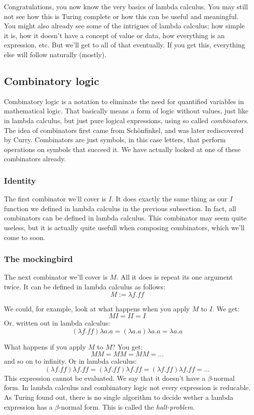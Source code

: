 \documentclass[a4paper]{article}
\begin{document}
Congratulations, you now know the very basics of lambda calculus. You may still
not see how this is Turing complete or how this can be useful and meaningful.
You might also already see some of the intrigues of lambda calculus; how simple
it is, how it doesn't have a concept of value or data, how everything is an
expression, etc. But we'll get to all of that eventually. If you get this,
everything else will follow naturally (mostly).

\subsection{Combinatory logic}


Combinatory logic is a notation to eliminate the need for quantified variables
in mathematical logic. That basically means a form of logic without values,
just like in lambda calculus, but just pure logical expressions, using so
called \emph{combinators}. The idea of combinators first came from Schönfinkel,
and was later rediscovered by Curry. Combinators are just symbols, in this case
letters, that perform operations on symbols that succeed it. We have actually
looked at one of these combinators already.

\subsubsection{Identity}

The first combinator we'll cover is \(I\). It does exactly the same thing as
our \(I\) function we defined in lambda calculus in the previous subsection.
In fact, all combinators can be defined in lambda calculus. This combinator may
seem quite useless, but it is actually quite usefull when composing
combinators, which we'll come to soon.

\subsubsection{The mockingbird}

The next combinator we'll cover is \(M\). All it does is repeat its one
argument twice. It can be defined in lambda calculus as follows:
\[M:=\lambda f.ff\]

We could, for example, look at what happens when you apply \(M\) to \(I\). We
get:
\[M I = I I = I\]
Or, written out in lambda calculus:
\[(\lambda f.ff)\lambda a.a=(\lambda a.a)\lambda a.a=\lambda a.a\]

What happens if you apply \(M\) to \(M\)? You get:
\[M M = M M = M M = ...\]
and so on to infinity. Or in lambda calculus:
\[(\lambda f.ff)\lambda f.ff=(\lambda f.ff)\lambda f.ff=(\lambda f.ff)\lambda f.ff=...\]
This expression cannot be evaluated. We say that it doesn't have a
\(\beta\)-normal form. In lambda calculus and combinatory logic not every
expression is reducable. As Turing found out, there is no single algorithm to
decide wether a lambda expression has a \(\beta\)-normal form. This is called
the \emph{halt-problem}.


\end{document}
